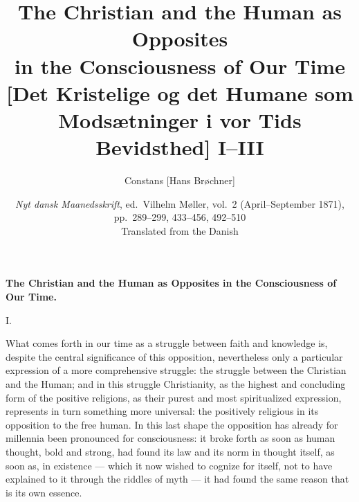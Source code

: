 \documentclass[12pt,a4paper,openany]{book}
\title{\textbf{The Christian and the Human as Opposites\\ in the Consciousness of Our Time}\\[8pt]
  \large [Det Kristelige og det Humane som Modsætninger i vor Tids Bevidsthed] I--III}
\author{Constans [Hans Brøchner]}
\date{\textit{Nyt dansk Maanedsskrift}, ed.\ Vilhelm Møller, vol.~2
  (April--September 1871), pp.~289--299, 433--456, 492--510\\[10pt]
  \small Translated from the Danish}
\newcommand{\secnum}[1]{\par\begin{center}#1\end{center}\par\nobreak}
\newcommand{\opage}[1]{\marginnote{\footnotesize\textit{[#1]}}}
\begin{document}
\maketitle
\thispagestyle{empty}
\clearpage

\opage{289}\begin{center}\textbf{\large The Christian and the Human as Opposites in the Consciousness of Our Time.}\end{center}

\secnum{I.}

What comes forth in our time as a struggle between
faith and knowledge is, despite the central significance of this opposition,
nevertheless only a particular expression of a more comprehensive
struggle: the struggle between the Christian and the Human; and in
this struggle Christianity, as the highest and concluding form of the positive
religions, as their purest and most spiritualized expression,
represents in turn something more universal: the
positively religious in its opposition to the free human.
In this last shape the opposition has already for
millennia been pronounced for consciousness: it broke
forth as soon as human thought, bold and strong, had
found its law and its norm in thought itself, as soon as, in
existence --- which it now wished to cognize for itself, not
to have explained to it through the riddles of myth --- it had found the same
reason that is its own essence.
\end{document}
